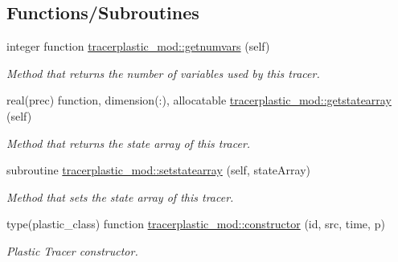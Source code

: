 \subsection*{Functions/\+Subroutines}
\begin{DoxyCompactItemize}
\item 
integer function \mbox{\hyperlink{namespacetracerplastic__mod_aa5367c2562d10b5393f263394f07fa49}{tracerplastic\+\_\+mod\+::getnumvars}} (self)
\begin{DoxyCompactList}\small\item\em Method that returns the number of variables used by this tracer. \end{DoxyCompactList}\item 
real(prec) function, dimension(\+:), allocatable \mbox{\hyperlink{namespacetracerplastic__mod_aa8cdd2196261b216dd6cdd5b7ef2fe90}{tracerplastic\+\_\+mod\+::getstatearray}} (self)
\begin{DoxyCompactList}\small\item\em Method that returns the state array of this tracer. \end{DoxyCompactList}\item 
subroutine \mbox{\hyperlink{namespacetracerplastic__mod_a5e5bd350455400938950d2129c1f4980}{tracerplastic\+\_\+mod\+::setstatearray}} (self, state\+Array)
\begin{DoxyCompactList}\small\item\em Method that sets the state array of this tracer. \end{DoxyCompactList}\item 
type(plastic\+\_\+class) function \mbox{\hyperlink{namespacetracerplastic__mod_ae68444b860b6e7abf3940b0ee1bfe57a}{tracerplastic\+\_\+mod\+::constructor}} (id, src, time, p)
\begin{DoxyCompactList}\small\item\em Plastic Tracer constructor. \end{DoxyCompactList}\end{DoxyCompactItemize}

